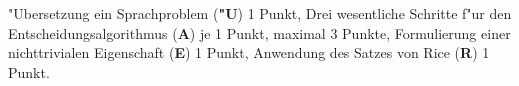 \begin{bewertung}
"Ubersetzung ein Sprachproblem ({\bf "U}) 1 Punkt,
Drei wesentliche Schritte f"ur den Entscheidungsalgorithmus ({\bf A})
je 1 Punkt, maximal 3 Punkte,
Formulierung einer nichttrivialen Eigenschaft ({\bf E}) 1 Punkt,
Anwendung des Satzes von Rice ({\bf R}) 1 Punkt.
\end{bewertung}

